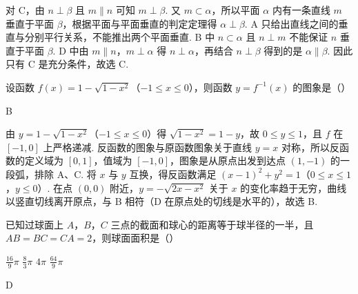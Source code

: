 \begin{solution}
对 C，由 \(n \perp \beta\) 且 \(m \parallel n\) 可知 \(m \perp \beta\). 又 \(m \subset \alpha\)，所以平面 \(\alpha\) 内有一条直线 \(m\) 垂直于平面 \(\beta\)，根据平面与平面垂直的判定定理得 \(\alpha \perp \beta\).
A 只给出直线之间的垂直与分别平行关系，不能推出两个平面垂直. B 中 \(n \subset \alpha\) 且 \(n \perp m\) 不能保证 \(n\) 垂直于平面 \(\beta\). D 中由 \(m \parallel n\)，\(m \perp \alpha\) 得 \(n \perp \alpha\)，再结合 \(n \perp \beta\) 得到的是 \(\alpha \parallel \beta\). 因此只有 C 是充分条件，故选 C.
\end{solution}

\begin{problem}
设函数 \(f(x) = 1 - \sqrt{1 - x^2}\)（\(-1 \leqslant x \leqslant 0\)），则函数 \(y = f^{-1}(x)\) 的图象是（\quad）

{}
{}
{}
\end{problem}

\begin{answer}
B
\end{answer}

\begin{solution}
由 \(y = 1 - \sqrt{1 - x^2}\)（\(-1 \leqslant x \leqslant 0\)）得 \(\sqrt{1 - x^2} = 1 - y\)，故 \(0 \leqslant y \leqslant 1\)，且 \(f\) 在 \([-1, 0]\) 上严格递减. 反函数的图象与原函数图象关于直线 \(y = x\) 对称，所以反函数的定义域为 \([0, 1]\)，值域为 \([-1, 0]\)，图象是从原点出发到达点 \((1, -1)\) 的一段弧，排除 A、C.
将 \(x\) 与 \(y\) 互换，得反函数满足 \((x - 1)^2 + y^2 = 1\)（\(0 \leqslant x \leqslant 1\)，\(y \leqslant 0\)）. 在点 \((0, 0)\) 附近，\(y = -\sqrt{2x - x^2}\) 关于 \(x\) 的变化率趋于无穷，曲线以竖直切线离开原点，与 B 相符（D 在原点处的切线是水平的），故选 B.
\end{solution}

\begin{problem}
已知过球面上 \(A\)，\(B\)，\(C\) 三点的截面和球心的距离等于球半径的一半，且 \(AB = BC = CA = 2\)，则球面面积是（\quad）

\choices
    {\(\frac{16}{9}\pi\)}
    {\(\frac{8}{3}\pi\)}
    {\(4\pi\)}
    {\(\frac{64}{9}\pi\)}
\end{problem}

\begin{answer}
D
\end{answer}

